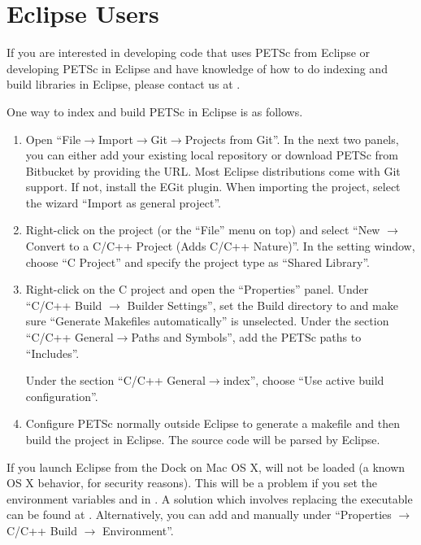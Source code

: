 {{{\section{Eclipse Users} 
If you are interested in developing code that uses PETSc from Eclipse or developing PETSc in Eclipse and have knowledge of how to do indexing and build libraries in Eclipse, please contact us at \href{mailto:petsc-dev@mcs.anl.gov}{}.

One way to index and build PETSc in Eclipse is as follows.
\begin{enumerate}
  \item Open ``File$\rightarrow$Import$\rightarrow$Git$\rightarrow$Projects from Git''.
  In the next two panels, you can either add your existing local repository or download PETSc from Bitbucket by providing the URL.
  Most Eclipse distributions come with Git support. If not, install the EGit plugin. When importing the project, select the wizard ``Import as general project''.
  \item Right-click on the project (or the ``File'' menu on top) and select ``New $\rightarrow$ Convert to a C/C++ Project (Adds C/C++ Nature)''.
  In the setting window, choose ``C Project'' and specify the project type as ``Shared Library''.
  \item Right-click on the C project and open the ``Properties'' panel. Under ``C/C++ Build $\rightarrow$ Builder Settings'',
  set the Build directory to  and make sure ``Generate Makefiles automatically'' is unselected.
  Under the section ``C/C++ General$\rightarrow$Paths and Symbols'', add the PETSc paths to ``Includes''.
  Under the section ``C/C++ General$\rightarrow$index'', choose ``Use active build configuration''.
  \item Configure PETSc normally outside Eclipse to generate a makefile and then build the project in Eclipse. The source code will be parsed by Eclipse.
\end{enumerate}

If you launch Eclipse from the Dock on Mac OS X,  will not be loaded (a known OS X behavior, for security reasons).
This will be a problem if you set the environment variables  and  in .
A solution which involves replacing the executable can be found at
\href{/questions/829749/launch-mac-eclipse-with-environment-variables-set}
{}.
Alternatively, you can add  and  manually under ``Properties $\rightarrow$ C/C++ Build $\rightarrow$ Environment''.

}}}
